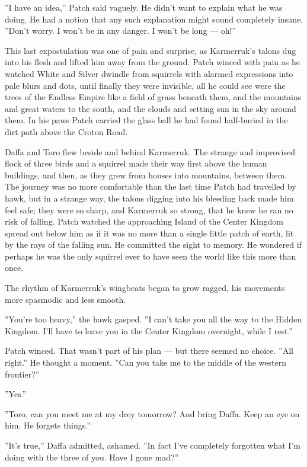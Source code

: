 \documentclass[12pt]{book}
\begin{document}
''I have an idea,'' Patch said vaguely. He didn't want to explain what he was doing. He had a notion that any such explanation might sound completely insane. ''Don't worry. I won't be in any danger. I won't be long ---
oh!''

This last expostulation was one of pain and surprise, as Karmerruk's talons dug into his flesh and lifted him away from the ground. Patch winced with pain as he watched White and Silver dwindle from squirrels with alarmed expressions into pale blurs and dots, until finally they were invisible, all he could see were the trees of the Endless Empire like a field of grass beneath them, and the mountains and great waters to the south, and the clouds and setting sun in the sky around them. In his paws Patch carried the glass ball he had found half-buried in the dirt path above the Croton Road.

Daffa and Toro flew beside and behind Karmerruk. The strange and improvised flock of three birds and a squirrel made their way first above the human buildings, and then, as they grew from houses into mountains, between them. The journey was no more comfortable than the last time Patch had travelled by hawk, but in a strange way, the talons digging into his bleeding back made him feel safe; they were so sharp, and Karmerruk so strong, that he knew he ran no risk of falling. Patch watched the approaching Island of the Center Kingdom spread out below him as if it was no more than a single little patch of earth, lit by the rays of the falling sun. He committed the sight to memory. He wondered if perhaps he was the only squirrel ever to have seen the world like this more than once.

The rhythm of Karmerruk's wingbeats began to grow ragged, his movements more spasmodic and less smooth.

''You're too heavy,'' the hawk gasped. ''I can't take you all the way to the Hidden Kingdom. I'll have to leave you in the Center Kingdom overnight, while I rest.''

Patch winced. That wasn't part of his plan ---
but there seemed no choice. ''All right.'' He thought a moment. ''Can you take me to the middle of the western frontier?''

''Yes.''

''Toro, can you meet me at my drey tomorrow? And bring Daffa. Keep an eye on him. He forgets things.''

''It's true,'' Daffa admitted, ashamed. ''In fact I've completely forgotten what I'm doing with the three of you. Have I gone mad?''
\end{document}
